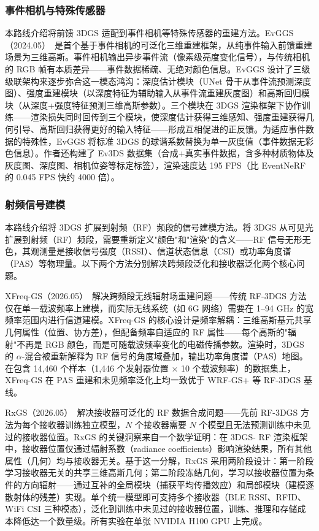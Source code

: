 \subsubsection{事件相机与特殊传感器}

本路线介绍将前馈 3DGS 适配到事件相机等特殊传感器的重建方法。EvGGS（2024.05）~\cite{2405_14959}是首个基于事件相机的可泛化三维重建框架，从纯事件输入前馈重建场景为三维高斯。事件相机输出异步事件流（像素级亮度变化信号），与传统相机的 RGB 帧有本质差异——事件数据稀疏、无绝对颜色信息。EvGGS 设计了三级级联架构来逐步弥合这一模态鸿沟：深度估计模块（UNet 骨干从事件流预测深度图）、强度重建模块（以深度特征为辅助输入从事件流重建灰度图）和高斯回归模块（从深度+强度特征预测三维高斯参数）。三个模块在 3DGS 渲染框架下协作训练——渲染损失同时回传到三个模块，使深度估计获得三维感知、强度重建获得几何引导、高斯回归获得更好的输入特征——形成互相促进的正反馈。为适应事件数据的特殊性，EvGGS 将标准 3DGS 的球谐系数替换为单一灰度值（事件数据无彩色信息）。作者还构建了 Ev3DS 数据集（合成+真实事件数据，含多种材质物体及灰度图、深度图、相机位姿等标定标签），渲染速度达 195 FPS（比 EventNeRF 的 0.045 FPS 快约 4000 倍）。

\subsubsection{射频信号建模}

本路线介绍将 3DGS 扩展到射频（RF）频段的信号建模方法。将 3DGS 从可见光扩展到射频（RF）频段，需要重新定义"颜色"和"渲染"的含义——RF 信号无形无色，其观测量是接收信号强度（RSSI）、信道状态信息（CSI）或功率角度谱（PAS）等物理量。以下两个方法分别解决跨频段泛化和接收器泛化两个核心问题。

XFreq-GS（2026.05）~\cite{2605_11432}解决跨频段无线辐射场重建问题——传统 RF-3DGS 方法仅在单一载波频率上建模，而实际无线系统（如 6G 网络）需要在 1--94 GHz 的宽频率范围内进行信道建模。XFreq-GS 的核心设计是频率解耦：三维高斯基元共享几何属性（位置、协方差），但配备频率自适应的 RF 属性——每个高斯的"辐射"不再是 RGB 颜色，而是可随载波频率变化的电磁传播参数。渲染时，3DGS 的 $\alpha$-混合被重新解释为 RF 信号的角度域叠加，输出功率角度谱（PAS）地图。在包含 14,460 个样本（1,446 个发射器位置 $\times$ 10 个载波频率）的数据集上，XFreq-GS 在 PAS 重建和未见频率泛化上均一致优于 WRF-GS+ 等 RF-3DGS 基线。

RxGS（2026.05）~\cite{2605_24290}解决接收器可泛化的 RF 数据合成问题——先前 RF-3DGS 方法为每个接收器训练独立模型，$N$ 个接收器需要 $N$ 个模型且无法预测训练中未见过的接收器位置。RxGS 的关键洞察来自一个数学证明：在 3DGS- RF 渲染框架中，接收器位置仅通过辐射系数（radiance coefficients）影响渲染结果，所有其他属性（几何）均与接收器无关。基于这一分解，RxGS 采用两阶段设计：第一阶段学习接收器无关的共享三维高斯几何；第二阶段冻结几何，学习以接收器位置为条件的方向辐射——通过互补的全局模块（捕获平均传播效应）和局部模块（建模逐散射体的残差）实现。单个统一模型即可支持多个接收器（BLE RSSI、RFID、WiFi CSI 三种模态），泛化到训练中未见过的接收器位置，训练、推理和存储成本降低达一个数量级。所有实验在单张 NVIDIA H100 GPU 上完成。

